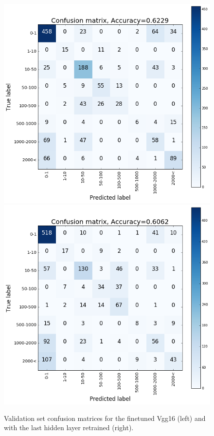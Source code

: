 \documentclass{article}
\begin{document}
\begin{figure}[ht]
\centering
\includegraphics[scale=0.35]{conf_mx_Zsolt1.png} \includegraphics[scale=0.35]{conf_mx_Zsolt2.png}
\caption{Validation set confusion matrices for the finetuned Vgg16 (left) and with the last hidden layer retrained (right).}
\label{fig:conf-mx-es}
\end{figure}
\end{document}
